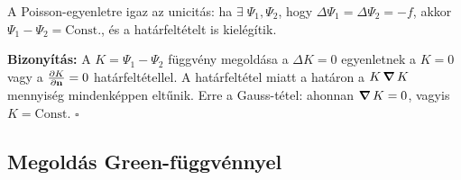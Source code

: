    A Poisson-egyenletre igaz az unicitás: ha $\exists\;\Psi_1,\Psi_2$, hogy $\Delta\Psi_1=\Delta\Psi_2=-f$, akkor $\Psi_1-\Psi_2=\text{Const.}$, és a határfeltételt is kielégítik.
   
   {\bf Bizonyítás:} A $K=\Psi_1-\Psi_2$ függvény megoldása a $\Delta K=0$ egyenletnek a $K=0$ vagy a $\frac{\partial K}{\partial \mathbf{n}}=0$ határfeltétellel. A határfeltétel miatt a határon a $K\mathop{\boldsymbol{\nabla}}\nolimits{K}$ mennyiség mindenképpen eltűnik. Erre a Gauss-tétel:
   ahonnan $\mathop{\boldsymbol{\nabla}}\nolimits{K}=0$, vagyis $K=\text{Const}$. $\square$
   
   
  \subsection{Megoldás Green-függvénnyel}
   
